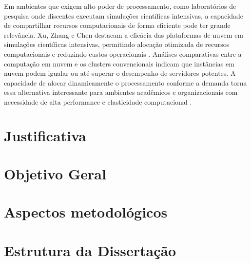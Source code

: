 Em ambientes que exigem alto poder de processamento, como laboratórios de pesquisa onde discentes executam simulações científicas intensivas, a capacidade de compartilhar recursos computacionais de forma eficiente pode ter grande relevância. Xu, Zhang e Chen destacam a eficácia das plataformas de nuvem em simulações científicas intensivas, permitindo alocação otimizada de recursos computacionais e reduzindo custos operacionais \cite{xu2021}. Análises comparativas entre a computação em nuvem e os clusters convencionais indicam que instâncias em nuvem podem igualar ou até superar o desempenho de servidores potentes. A capacidade de alocar dinamicamente o processamento conforme a demanda torna essa alternativa interessante para ambientes acadêmicos e organizacionais com necessidade de alta performance e elasticidade computacional \cite{roloff2012}. 

\section{Justificativa}

\section{Objetivo Geral}

\section{Aspectos metodológicos}

\section{Estrutura da Dissertação}

